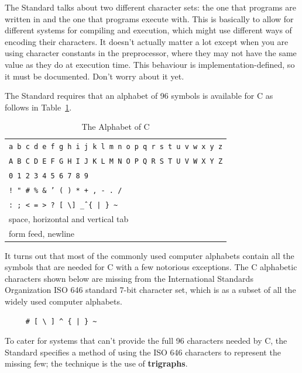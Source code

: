    The Standard talks about two different character sets: the one that
    programs are written in and the one that programs execute with. This is
    basically to allow for different systems for compiling and execution,
    which might use different ways of encoding their characters. It doesn't
    actually matter a lot except when you are using character constants in the
    preprocessor, where they may not have the same value as they do at
    execution time. This behaviour is implementation-defined, so it must be
    documented. Don't worry about it yet.


    The Standard requires that an alphabet of 96 symbols 
    is available for C as follows in Table~\ref{tab:alphabetC}. 

    \begin{table}[htb]
     \centering
      \begin{tabular}{p{}}
        \toprule
        \texttt{a b c d e f g h i j k l m n o p q r s t u v w x y z}    \\
        \texttt{A B C D E F G H I J K L M N O P Q R S T U V W X Y Z}    \\
        \texttt{0 1 2 3 4 5 6 7 8 9}    \\
        \texttt{! " \# \% \& ' ( ) * + , - . /}    \\
        \texttt{: ; < = > ? [ \textbackslash ] \^ \_ \{ | \} \~}    \\
        space, horizontal and vertical tab    \\
        form feed, newline    \\
        \bottomrule
      \end{tabular}
      \caption{\label{tab:alphabetC}The Alphabet of C}
    \end{table}



   It turns out that most of the commonly used computer alphabets contain
    all the symbols that are needed for C with a few notorious exceptions. The
    C alphabetic characters shown below are missing from the International
    Standards Organization ISO 646 standard 7-bit character set, which is
    as a subset of all the widely used computer alphabets.


   \begin{Verbatim}
     # [ \ ] ^ { | } ~
   \end{Verbatim}

   To cater for systems that can't provide the full 96 characters
    needed by C, the Standard specifies a method of using the
    ISO 646 characters to represent the missing few; the technique is the
    use of \textbf{trigraphs}.



